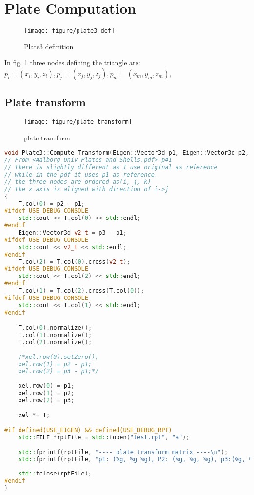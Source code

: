 
\section{Plate Computation}
\begin{figure}[h!]
\centering
\texttt{[image: figure/plate3\_def]}
\caption{Plate3 definition}
\label{fig:plate3def}
\end{figure}

In fig. \ref{fig:plate3def} three nodes defining the triangle are: $ p_i = (x_i, y_i, z_i), p_j = (x_j, y_j, z_j),  p_m = (x_m, y_m, z_m),  $

\subsection{Plate transform}
\begin{figure}[h!]
\centering
\texttt{[image: figure/plate\_transform]}
\caption{plate transform}
\label{fig:platetransform}
\end{figure}

\begin{lstlisting}[language=c++]
void Plate3::Compute_Transform(Eigen::Vector3d p1, Eigen::Vector3d p2, Eigen::Vector3d p3, Eigen::Matrix3d &T, Eigen::Matrix3d &xel)
// From <Aalborg_Univ_Plates_and_Shells.pdf> p41
// there is slightly different as I use original as reference
// while in the pdf it uses p1 as reference.
// the three nodes are ordered as(i, j, k)
// the x axis is aligned with direction of i->j
{
	T.col(0) = p2 - p1;
#ifdef USE_DEBUG_CONSOLE
	std::cout << T.col(0) << std::endl;
#endif
	Eigen::Vector3d v2_t = p3 - p1;
#ifdef USE_DEBUG_CONSOLE
	std::cout << v2_t << std::endl;
#endif
	T.col(2) = T.col(0).cross(v2_t);
#ifdef USE_DEBUG_CONSOLE
	std::cout << T.col(2) << std::endl;
#endif
	T.col(1) = T.col(2).cross(T.col(0));
#ifdef USE_DEBUG_CONSOLE
	std::cout << T.col(1) << std::endl;
#endif

	T.col(0).normalize();
	T.col(1).normalize();
	T.col(2).normalize();
	
	/*xel.row(0).setZero();
	xel.row(1) = p2 - p1;
	xel.row(2) = p3 - p1;*/
	
	xel.row(0) = p1;
	xel.row(1) = p2;
	xel.row(2) = p3;
	
	xel *= T;

#if defined(USE_EIGEN) && defined(USE_DEBUG_RPT)
	std::FILE *rptFile = std::fopen("test.rpt", "a");
	
	std::fprintf(rptFile, "---- plate transform matrix ----\n");
	std::fprintf(rptFile, "p1: (%g, %g %g), P2: (%g, %g, %g), p3:(%g, %g, %g)\n", p1[0], p1[1], p1[2], p2[0], p2[1], p2[2], p3[0], p3[1], p3[2]);
	
	std::fclose(rptFile);
#endif
}
\end{lstlisting}

